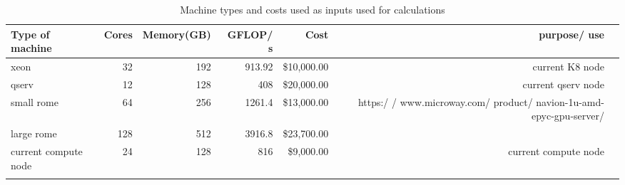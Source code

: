 \tiny \begin{longtable} { |p{}  |r  |r  |r  |r  |r  |r |} 
\caption{Machine types and costs used as inputs used for calculations \label{tab:Machines}}\\ 
\hline 
{Type of machine }&{Cores}&{Memory(GB)}&{GFLOP/ s}&{Cost}&{purpose/ use } \\ \hline
{xeon }&{32}&{192}&{913.92}&{\$10,000.00}&{current K8 node } \\ \hline
{qserv }&{12}&{128}&{408}&{\$20,000.00}&{current qserv node } \\ \hline
{small rome  }&{64}&{256}&{1261.4}&{\$13,000.00}&{https:/ / www.microway.com/ product/ navion-1u-amd-epyc-gpu-server/ } \\ \hline
{large rome }&{128}&{512}&{3916.8}&{\$23,700.00}& \\ \hline
{current compute node }&{24}&{128}&{816}&{\$9,000.00}&{current compute node} \\ \hline
{}&{}&{}&{}&{}&{} \\ \hline
\end{longtable} \normalsize
